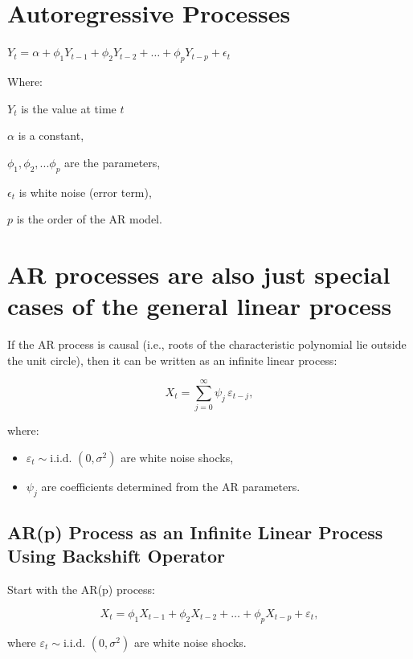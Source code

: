 \documentclass[
  11pt,
  a4paper,
]{report}
\begin{document}
\section{Autoregressive Processes}\label{autoregressive-processes}

\(Y_t = \alpha + \phi_1 Y_{t-1} + \phi_2 Y_{t-2} + \dots + \phi_p Y_{t-p} + \epsilon_t\)

Where:

\(Y_t\) is the value at time \(t\)

\(\alpha\) is a constant,

\(\phi_1, \phi_2,...\phi_p\) are the parameters,

\(\epsilon_t\) is white noise (error term),

\(p\) is the order of the AR model.

\section{AR processes are also just special cases of the general linear
process}\label{ar-processes-are-also-just-special-cases-of-the-general-linear-process}

If the AR process is causal (i.e., roots of the characteristic
polynomial lie outside the unit circle), then it can be written as an
infinite linear process:

\[X_t = \sum_{j=0}^{\infty} \psi_j \, \varepsilon_{t-j},\]

where:

\begin{itemize}
\item
  \(\varepsilon_t \sim \text{i.i.d. }(0, \sigma^2)\) are white noise
  shocks,
\item
  \(\psi_j\) are coefficients determined from the AR parameters.
\end{itemize}

\subsection{AR(p) Process as an Infinite Linear Process Using Backshift
Operator}\label{arp-process-as-an-infinite-linear-process-using-backshift-operator}

Start with the AR(p) process:

\[X_t = \phi_1 X_{t-1} + \phi_2 X_{t-2} + \dots + \phi_p X_{t-p} + \varepsilon_t,\]

where \(\varepsilon_t \sim \text{i.i.d. }(0, \sigma^2)\) are white noise
shocks.
\end{document}
